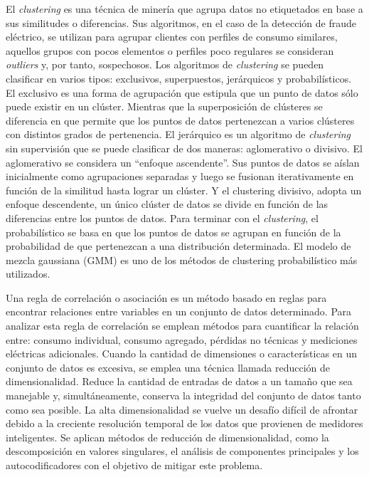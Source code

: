 \documentclass[12pt,a4paper]{report}
\begin{document}
El \emph{clustering} es una técnica de minería que agrupa datos no etiquetados en base a sus similitudes o diferencias. Sus algoritmos, en el caso de la detección de fraude eléctrico, se utilizan para agrupar clientes con perfiles de consumo similares, aquellos grupos con pocos elementos o perfiles poco regulares se consideran \emph{outliers} y, por tanto, sospechosos. Los algoritmos de \emph{clustering} se pueden clasificar en varios tipos: exclusivos, superpuestos, jerárquicos y probabilísticos. El exclusivo es una forma de agrupación que estipula que un punto de datos sólo puede existir en un clúster. Mientras que la superposición de clústeres se diferencia en que permite que los puntos de datos pertenezcan a varios clústeres con distintos grados de pertenencia. El jerárquico es un algoritmo de \emph{clustering} sin supervisión que se puede clasificar de dos maneras: aglomerativo o divisivo. El aglomerativo se considera un “enfoque ascendente”. Sus puntos de datos se aíslan inicialmente como agrupaciones separadas y luego se fusionan iterativamente en función de la similitud hasta lograr un clúster. Y el clustering divisivo, adopta un enfoque descendente, un único clúster de datos se divide en función de las diferencias entre los puntos de datos. Para terminar con el \emph{clustering}, el probabilístico se basa en que los puntos de datos se agrupan en función de la probabilidad de que pertenezcan a una distribución determinada. El modelo de mezcla gaussiana (GMM) es uno de los métodos de clustering probabilístico más utilizados.

Una regla de correlación o asociación es un método basado en reglas para encontrar relaciones entre variables en un conjunto de datos determinado. Para analizar esta regla de correlación se emplean métodos para cuantificar la relación entre: consumo individual, consumo agregado, pérdidas no técnicas y mediciones eléctricas adicionales. Cuando la cantidad de dimensiones o características en un conjunto de datos es excesiva, se emplea una técnica llamada reducción de dimensionalidad. Reduce la cantidad de entradas de datos a un tamaño que sea manejable y, simultáneamente, conserva la integridad del conjunto de datos tanto como sea posible. La alta dimensionalidad se vuelve un desafío difícil de afrontar debido a la creciente resolución temporal de los datos que provienen de medidores inteligentes. Se aplican métodos de reducción de dimensionalidad, como la descomposición en valores singulares, el análisis de componentes principales y los autocodificadores con el objetivo de mitigar este problema.
\end{document}
